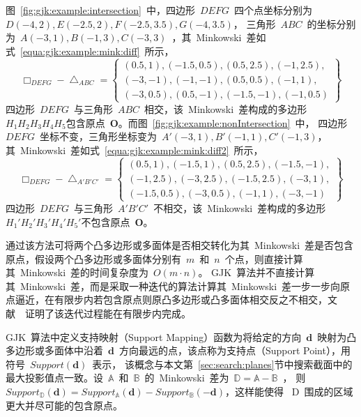 图~\ref{fig:gjk:example:intersection}~中，四边形~$DEFG$~四个点坐标分别为$D(-4, 2), E(-2.5, 2), F(-2.5, 3.5), G(-4, 3.5)$，
三角形~$ABC$~的坐标分别为~$A(-3, 1), B(-1,3), C(-3, 3)$~，其~Minkowski~差如式~\ref{equa:gjk:example:mink:diff}~所示，
\begin{equation}
\label{equa:gjk:example:mink:diff}
\Box_{DEFG} - \bigtriangleup_{ABC} = \left\{ 
  \begin{array}{l}
    (0.5, 1),  (-1.5, 0.5),  (0.5, 2.5), (-1, 2.5), \\ 
    (-3, -1), (-1, -1),  (0.5, 0.5), (-1, 1), \\
    (-3, 0.5), (0.5, -1), (-1.5, -1), (-1, 0.5)
  \end{array}
    \right\}  
\end{equation}
四边形~$DEFG$~与三角形~$ABC$~相交，该~Minkowski~差构成的多边形~$H_1H_2H_3H_4H_5$包含原点~$\bm{O}$。而图~\ref{fig:gjk:example:nonIntersection}~中，
四边形~$DEFG$~坐标不变，三角形坐标变为~$A'(-3, 1), B'(-1, 1), C'(-1,3)$，其~Minkowski~差如式~\ref{equa:gjk:example:mink:diff2}~所示，
\begin{equation}
\label{equa:gjk:example:mink:diff2}
\Box_{DEFG} - \bigtriangleup_{A'B'C'} = \left\{ 
  \begin{array}{l}
   (0.5, 1), (-1.5, 1), (0.5, 2.5)  , (-1.5, -1), \\
   (-1, 2.5),(-3, 2.5),  (-1.5, 2.5), (-3, 1),  \\
   (-1.5, 0.5), (-3, 0.5), (-1, 1),(-3, -1) 
  \end{array}
  \right\}  
\end{equation}
四边形~$DEFG$~与三角形~$A'B'C'$~不相交，该~Minkowski~差构成的多边形~$H_1'H_2'H_3'H_4'H_5'$不包含原点~$\bm{O}$。

通过该方法可将两个凸多边形或多面体是否相交转化为其~Minkowski~差是否包含原点，假设两个凸多边形或多面体分别有~$m$~和~$n$~个点，则直接计算其~Minkowski~差的时间复杂度为~$O(m \cdot n)$。
GJK~算法并不直接计算其~Minkowski~差，而是采取一种迭代的算法计算其~Minkowski~差一步一步向原点逼近，在有限步内若包含原点则原凸多边形或凸多面体相交反之不相交，文献~~证明了该迭代过程能在有限步内完成。

GJK~算法中定义支持映射（Support Mapping）函数为将给定的方向~$\bm{d}$~映射为凸多边形或多面体中沿着~$\bm{d}$~方向最远的点，该点称为支持点（Support Point），用符号~$Support(\bm{d})$~表示，
该概念与本文第~\ref{sec:search:planes}节中搜索截面中的最大投影值点一致。设~$\mathbb{A}$~和~$\mathbb{B}$~的~Minkowski~差为~$\mathbb{D} = \mathbb{A}-\mathbb{B}$~，
则~$Support_\mathbb{D}(\bm{d}) = Support_\mathbb{A}(\bm{d}) - Support_\mathbb{B}(-\bm{d})$，这样能使得
~D~围成的区域更大并尽可能的包含原点。

